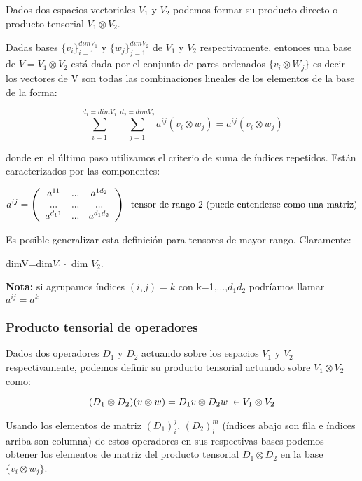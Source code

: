 Dados dos espacios vectoriales $V_1$ y $V_2$ podemos formar su producto directo o producto tensorial $V_1 \otimes V_2$.

Dadas bases $\lbrace v_i\rbrace _{i=1}^{dim V_1}$ y $\lbrace w_j\rbrace _{j=1}^{dim V_2}$ de $V_1$ y $V_2$ respectivamente, entonces una base de $V=V_1 \otimes V_2$ está dada por el conjunto de pares ordenados $\lbrace v_i \otimes W_j \rbrace$ es decir los vectores de V son todas las combinaciones lineales de los elementos de la base de la forma:

$$\sum _{i=1}^{d_1=dim V_1}\sum _{j=1}^{d_2=dimV_2} a^{ij}(v_i\otimes w_j)=a^{ij}(v_i \otimes w_j)$$

donde en el último paso utilizamos el criterio de suma de índices repetidos. Están caracterizados por las componentes:

$$a^{ij}=\left ( \begin{array}{ccc}
a^{11} & ... & a^{1d_2} \\
... & ... & ... \\
a^{d_11} & ... & a^{d_1d_2}
\end{array}\right) \hspace{0.2cm} \text{tensor de rango 2 (puede entenderse como una matriz)}$$

\smallskip

Es posible generalizar esta definición para tensores de mayor rango. Claramente:
\begin{center}
dimV=dim$V_1 \cdot $ dim $V_2$.

\end{center}

\textbf{Nota:} si agrupamos índices $(i,j)=k$ con k=1,...,$d_1d_2$ podríamos llamar $a^{ij}=a^k$

\subsubsection{Producto tensorial de operadores}

Dados dos operadores $D_1$ y $D_2$ actuando sobre los espacios $V_1$ y $V_2$ respectivamente, podemos definir su producto tensorial actuando sobre $V_1 \otimes V_2$ como:

$$(D_1\otimes D_2)(v\otimes w)=D_1v \otimes D_2w  \hspace{0.1cm} \in V_1 \otimes V_2$$

Usando los elementos de matriz $(D_1)^j_i$, $(D_2)^m_l$ (índices abajo son fila e índices arriba son columna) de estos operadores en sus respectivas bases podemos obtener los elementos de matriz del producto tensorial $D_1 \otimes D_2$ en la base $\lbrace v_i\otimes w_j \rbrace$.

